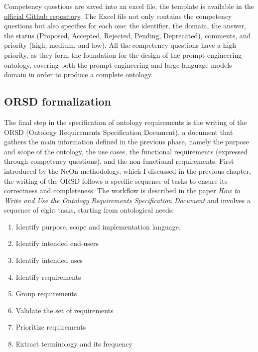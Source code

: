 Competency questions are saved into an excel file, the template is available in the \href{https://github.com/oeg-upm/LOT-resources}{official Github repository}. The Excel file not only contains the competency questions but also specifies for each one: the identifier, the domain, the answer, the status (Proposed, Accepted, Rejected, Pending, Deprecated), comments, and priority (high, medium, and low). All the competency questions have a high priority, as they form the foundation for the design of the prompt engineering ontology, covering both the prompt engineering and large language models domain in order to produce a complete ontology.

\subsection{ORSD formalization}
The final step in the specification of ontology requirements is the writing of the ORSD (Ontology Requirements Specification Document), a document that gathers the main information defined in the previous phase, namely the purpose and scope of the ontology, the use cases, the functional requirements (expressed through competency questions), and the non-functional requirements. First introduced by the NeOn methodology, which I discussed in the previous chapter, the writing of the ORSD follows a specific sequence of tasks to ensure its correctness and completeness. The workflow is described in the paper \textit{How to Write and Use the Ontology Requirements Specification Document}\cite{suarez2009write} and involves a sequence of eight tasks, starting from ontological needs: 
\begin{enumerate}
    \item Identify purpose, scope and implementation language.
    \item Identify intended end-users
    \item Identify intended uses
    \item Identify requirements
    \item Group requirements
    \item Validate the set of requirements
    \item Prioritize requirements
    \item Extract terminology and its frequency
\end{enumerate}

